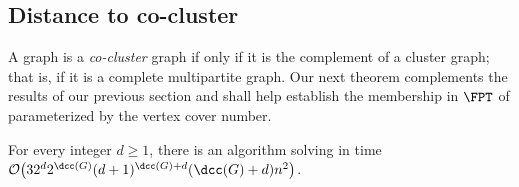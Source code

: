 \subsection{Distance to co-cluster}
\label{sec:cocluster}

A graph is a \emph{co-cluster} graph if only if it is the complement of a cluster graph; that is, if it is a complete multipartite graph.
Our next theorem complements the results of our previous section and shall help establish the membership  in $\FPT$ of  parameterized by the vertex cover number.

\begin{theorem}
    \label{thm:fpt_cocluster}
    For every integer $d \geq 1$, there is an algorithm solving  in time $\bigO{32^d2^{\dcc(G)}(d+1)^{\dcc(G)+d}(\dcc(G)+d)n^2}$.
\end{theorem}

